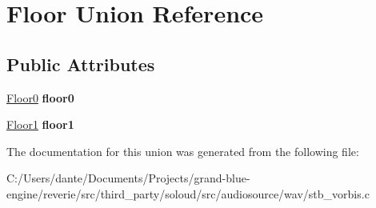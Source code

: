 \hypertarget{union_floor}{}\section{Floor Union Reference}
\label{union_floor}
\subsection*{Public Attributes}
\begin{DoxyCompactItemize}
\item 
\mbox{\label{union_floor_a2330ff2cbd7ee66f38487546bbe03453}} 
\mbox{\hyperlink{struct_floor0}{Floor0}} {\bfseries floor0}
\item 
\mbox{\label{union_floor_adc1ac1b2639d665d8a7df65714a03f95}} 
\mbox{\hyperlink{struct_floor1}{Floor1}} {\bfseries floor1}
\end{DoxyCompactItemize}


The documentation for this union was generated from the following file\+:\begin{DoxyCompactItemize}
\item 
C\+:/\+Users/dante/\+Documents/\+Projects/grand-\/blue-\/engine/reverie/src/third\+\_\+party/soloud/src/audiosource/wav/stb\+\_\+vorbis.\+c\end{DoxyCompactItemize}
